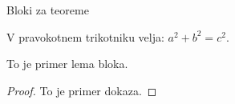 \documentclass[slovene]{beamer}
\begin{document}



\begin{frame}{Bloki za teoreme}
  \begin{theorem}
    V pravokotnem trikotniku velja: $a^2 + b^2 = c^2$.
  \end{theorem}

  \begin{lemma}
    To je primer lema bloka.
  \end{lemma}

  \begin{proof}
    To je primer dokaza.
  \end{proof}

\end{frame}
\end{document}
